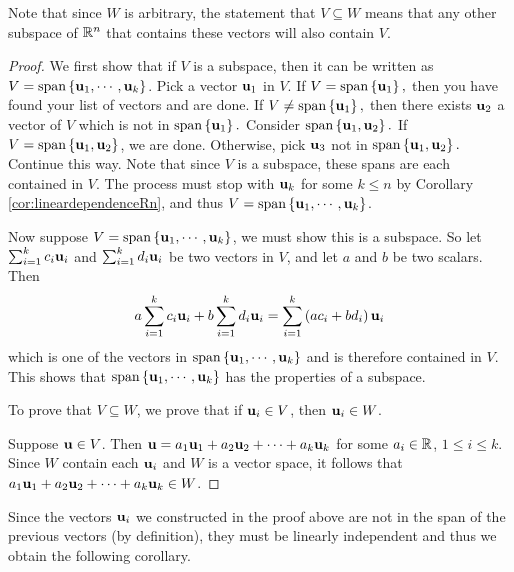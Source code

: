 Note that since $W$ is arbitrary, the statement that $V \subseteq W$ means that any other subspace of $\mathbb{R}^n$ that contains these vectors will also contain $V$. 

\begin{proof}
We first show that if $V$ is a subspace, then it can be written as $V= \mbox{span}\left\{ {\bf u}_{1},\cdots ,{\bf u}_{k}\right\}$. Pick a vector ${\bf u}_{1}$ in $V$. If $V=
\mbox{span}\left\{ {\bf u}_{1}\right\} ,$ then you have found your
list of vectors and are done. If $V\neq \mbox{span}\left\{ {\bf u}_{1}\right\} ,$ then
there exists ${\bf u}_{2}$ a vector of $V$ which is not in $
\mbox{span}\left\{ {\bf u}_{1}\right\} .$ Consider $\mbox{span}\left\{ 
{\bf u}_{1},{\bf u}_{2}\right\}.$ 
If $V=\mbox{span}\left\{ {\bf u}_{1},{\bf u}_{2}\right\}$, we are
done. Otherwise, pick ${\bf u}_{3}$ not in $\mbox{span}\left\{ {\bf u}_{1},{\bf u}_{2}\right\} .$ Continue this way.
Note that since $V $ is a subspace, these spans are each contained in
$V$.  The process must stop with ${\bf u}_{k}$ for some $k\leq n$
by Corollary \ref{cor:lineardependenceRn}, and thus $V=\mbox{span}\left\{ {\bf u}_{1},\cdots ,
{\bf u}_{k}\right\}$.

Now suppose $V=\mbox{span}\left\{ {\bf u}_{1},\cdots ,
{\bf u}_{k}\right\}$, we must show this is a subspace. So let $\sum_{i=1}^{k}c_{i}{\bf u}_{i}$ and $
\sum_{i=1}^{k}d_{i}{\bf u}_{i}$ be two vectors in $V$, and let $a$
and $b$ be two scalars. Then 
\begin{equation*}
a \sum_{i=1}^{k}c_{i}{\bf u}_{i}+ b \sum_{i=1}^{k}d_{i}{\bf u}_{i}=
 \sum_{i=1}^{k}\left( a c_{i}+b  d_{i}\right) {\bf u}_{i}
\end{equation*}
which is one of the vectors in $\mbox{span}\left\{ {\bf u}_{1},\cdots ,
{\bf u}_{k}\right\}$ and is therefore contained in $V$. This shows that $\mbox{span}\left\{ {\bf u}_{1},\cdots ,{\bf u}_{k}\right\} $ has the properties of a subspace. 

To prove that $V \subseteq W$, we prove that if
${\bf u}_i\in V$, then ${\bf u}_i \in W$.

Suppose ${\bf u}\in V$. 
Then ${\bf u}=a_1{\bf u}_1 + a_2{\bf u}_2 + \cdots + a_k{\bf u}_k$
for some $a_i\in\mathbb{R}$, $1\leq i\leq k$.
Since $W$ contain each ${\bf u}_i$ and $W$ is a vector space, it follows that $ a_1{\bf u}_1 + a_2{\bf u}_2 + \cdots + a_k{\bf u}_k \in W$. 
\end{proof}

Since the vectors ${\bf u}_i$ we constructed in the proof above are not in the span
of the previous vectors (by definition), they must be linearly independent and thus we
obtain the following corollary.

